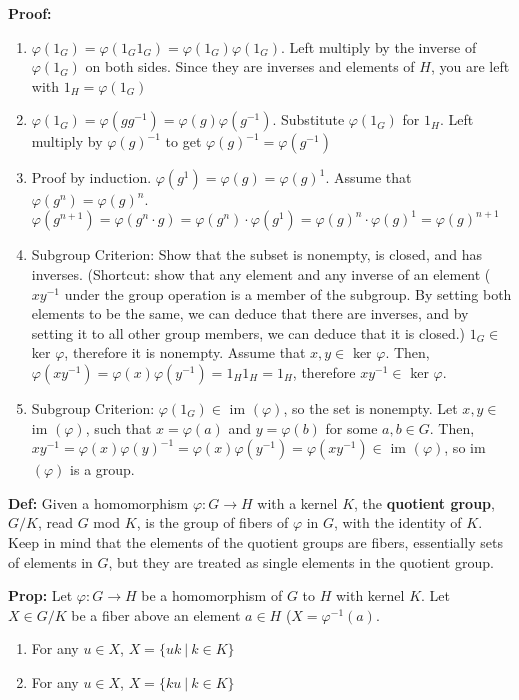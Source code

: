 \documentclass{article}
\begin{document}
\textbf{Proof:}
\begin{enumerate}
    \item $\varphi(1_G) = \varphi(1_G 1_G) = \varphi(1_G) \varphi (1_G)$. Left multiply by the inverse of $\varphi (1_G)$ on both sides. Since they are inverses and elements of $H$, you are left with $1_H = \varphi (1_G)$
    \item $\varphi (1_G) = \varphi (g g^{-1}) = \varphi (g) \varphi (g^{-1})$. Substitute $\varphi (1_G)$ for $1_H$. Left multiply by $\varphi (g)^{-1}$ to get $\varphi(g)^{-1} = \varphi (g^{-1})$
    \item Proof by induction. $\varphi(g^1) = \varphi (g) = \varphi (g) ^1$. Assume that $\varphi (g^n) = \varphi (g)^n$. $\varphi(g^{n+1}) = \varphi (g^n \cdot g) = \varphi (g^n) \cdot \varphi (g^1) = \varphi (g)^n \cdot \varphi (g)^1 = \varphi (g)^{n+1} $
    \item Subgroup Criterion: Show that the subset is nonempty, is closed, and has inverses. (Shortcut: show that any element and any inverse of an element ($xy^{-1}$ under the group operation is a member of the subgroup. By setting both elements to be the same, we can deduce that there are inverses, and by setting it to all other group members, we can deduce that it is closed.)
    $1_G \in$ ker $\varphi$, therefore it is nonempty.
    Assume that $x,y \in$ ker $\varphi$. Then, $\varphi (xy^{-1}) = \varphi (x) \varphi (y^{-1}) = 1_H 1_H = 1_H$, therefore $xy^{-1} \in$ ker $\varphi$.
    \item Subgroup Criterion: $\varphi (1_G) \in $ im $(\varphi)$, so the set is nonempty. Let $x,y \in $ im $(\varphi)$, such that $x = \varphi (a)$ and $y = \varphi (b)$ for some $a,b \in G$. Then, $xy^{-1} = \varphi(x) \varphi(y)^{-1} = \varphi (x) \varphi(y^{-1}) = \varphi (xy^{-1}) \in $ im $(\varphi)$, so im $(\varphi)$ is a group. 
\end{enumerate} 

\textbf{Def:} Given a homomorphism $\varphi: G \rightarrow H$ with a kernel $K$, the \textbf{quotient group}, $G/K$, read $G$ mod $K$, is the group of fibers of $\varphi$ in $G$, with the identity of $K$. Keep in mind that the elements of the quotient groups are fibers, essentially sets of elements in $G$, but they are treated as single elements in the quotient group.

\textbf{Prop:}
Let $\varphi:G\rightarrow H$ be a homomorphism of $G$ to $H$ with kernel $K$. Let $X \in G/K$ be a fiber above an element $a \in H$ ($X = \varphi^{-1}(a)$.
\begin{enumerate}
    \item For any $u \in X$, $X = \{ uk \:|\: k \in K\}$
    \item For any $u \in X$, $X = \{ku \:|\: k \in K\} $
\end{enumerate}
\end{document}

